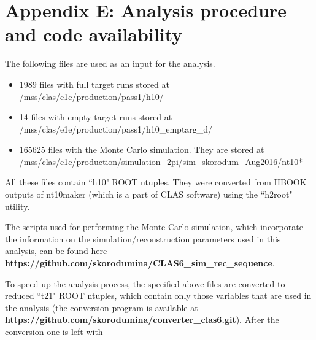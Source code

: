 \newpage

\renewcommand{\thesection}{E}
    \makeatletter
   \renewcommand{\theequation}{\thesection.\@arabic\c@equation}
    \makeatother
\section*{Appendix E: Analysis procedure and code availability}
\label{app_code}

The following files are used as an input for the analysis.\vspace{-1em}

\begin{itemize}
\item 1989 files with full target runs stored at\\[-0.75mm]
 /mss/clas/e1e/production/pass1/h10/\vspace{-0.7em}
\item 14 files with empty target runs stored at\\[-0.75mm]
/mss/clas/e1e/production/pass1/h10\_emptarg\_d/\vspace{-0.7em}
\item 165625 files with the Monte Carlo simulation. They are stored at\\[-0.75mm]
/mss/clas/e1e/production/simulation\_2pi/sim\_skorodum\_Aug2016/nt10*
\vspace{-0.5em}
\end{itemize}


All these files contain ``h10" ROOT ntuples. They were converted from HBOOK outputs of nt10maker (which is a part of CLAS software) using the ``h2root" utility.

The scripts used for performing the Monte Carlo simulation, which incorporate the information on the simulation/reconstruction parameters used in this analysis, can be found here {\bf https://github.com/skorodumina/CLAS6\_sim\_rec\_sequence}.


To speed up the analysis process, the specified above files are converted to reduced ``t21" ROOT ntuples, which contain only those variables that are used in the analysis (the conversion program is available at {\bf https://github.com/skorodumina/converter\_clas6.git}). After the conversion one is left with \vspace{-1em}


